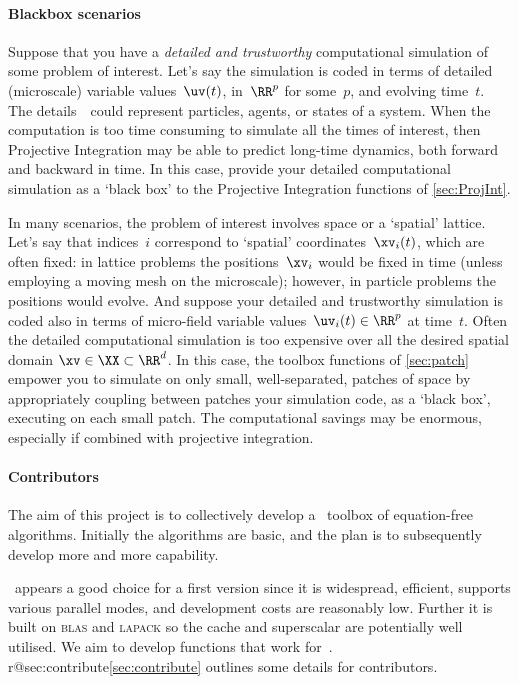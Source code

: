 \paragraph{Blackbox scenarios} 
Suppose that you have a \emph{detailed and trustworthy} computational simulation of some problem of interest.
Let's say the simulation is coded in terms of detailed (microscale) variable values~\(\uv(t)\), in~\(\RR^{p}\) for some~\(p\), and evolving time~\(t\).
The details~\uv\ could represent particles, agents, or states of a system.
When the computation is too time consuming to simulate all the times of interest, then Projective Integration may be able to predict long-time dynamics, both forward and backward in time.  
In this case, provide your detailed computational simulation as a `black box' to the Projective Integration functions of \cref{sec:ProjInt}.

In many scenarios, the problem of interest involves space or a `spatial' lattice.
Let's say that indices~\(i\) correspond to `spatial' coordinates~\(\xv_i(t)\), which are often fixed: in lattice problems the positions~\(\xv_i\) would be fixed in time (unless employing a moving mesh on the microscale); however, in particle problems the positions would evolve.
And suppose your detailed and trustworthy simulation is coded also in terms of micro-field variable values~\(\uv_i(t)\in\RR^p\) at time~\(t\).
Often the detailed computational simulation is too expensive over all the desired spatial domain \(\xv\in\XX\subset\RR^{d}\).
In this case, the toolbox functions of \cref{sec:patch} empower you to simulate on only small, well-separated, patches of space by appropriately coupling between patches your simulation code, as a `black box', executing on each small patch. 
The computational savings may be enormous, especially if combined with projective integration.



\paragraph{Contributors}
The aim of this project is to collectively develop a \script\ toolbox of equation-free algorithms.
Initially the algorithms are basic, and the plan is to subsequently develop more and more capability.

\Matlab\ appears a good choice for a first version since it is widespread, efficient, supports various parallel modes, and development costs are reasonably low.
Further it is built on \textsc{blas} and \textsc{lapack} so the cache and superscalar \cpu{} are potentially well utilised.
We aim to develop functions that work for~\script.
\ifcsname r@sec:contribute\endcsname\cref{sec:contribute} outlines some details for contributors.\fi



